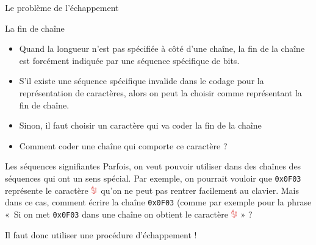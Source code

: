 \begin{frame}{Le problème de l'échappement}
  \begin{block}{La fin de chaîne}
    \begin{itemize}
    \item[\ddialoginformation] Quand la longueur n'est pas spécifiée à côté
      d'une chaîne, la fin de la chaîne est forcément indiquée par une
      séquence spécifique de bits.
    \item S'il existe une séquence spécifique invalide dans le codage pour la
      représentation de caractères, alors on peut la choisir comme
      représentant la fin de chaîne.
    \item Sinon, il faut choisir un caractère qui va coder la fin de la chaîne
    \item[\dialogerror] Comment coder une chaîne qui comporte ce caractère ?
    \end{itemize}
  \end{block}
  \begin{block}{Les séquences signifiantes}
    Parfois, on veut pouvoir utiliser dans des chaînes des séquences qui ont
    un sens spécial. Par exemple, on pourrait vouloir que \texttt{0x0F03}
    représente le caractère \includegraphics[height=1em]{img/04/U0F03}\ qu'on
    ne peut pas rentrer facilement au clavier. Mais dans ce cas, comment
    écrire la chaîne \texttt{0x0F03} (comme par exemple pour la phrase «~Si on
    met \texttt{0x0F03} dans une chaîne on obtient le
    caractère \includegraphics[height=1em]{img/04/U0F03}~» ?
  \end{block}

  Il faut donc utiliser une procédure d'échappement !
\end{frame}
